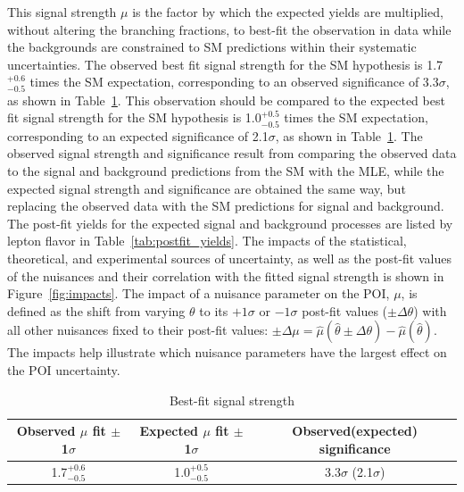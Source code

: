 This signal strength $\mu$ is the factor by which the expected \tth yields are multiplied, without altering the branching fractions, to best-fit the observation in data
while the backgrounds are constrained to SM predictions within their systematic uncertainties.
The observed  best fit signal strength for the SM \tth hypothesis is 1.7$^{+0.6}_{-0.5}$ times the SM expectation,
corresponding to an observed significance of 3.3$\sigma$, as shown in Table~\ref{tab:mu}.
This observation should be compared to the expected best fit signal strength for the SM \tth hypothesis is 1.0$^{+0.5}_{-0.5}$ times the SM expectation,
corresponding to an expected significance of 2.1$\sigma$, as shown in Table~\ref{tab:mu}.
The observed signal strength and significance result from comparing the observed data to the signal and background predictions from the SM with the MLE,
while the expected signal strength and significance are obtained the same way, but replacing the observed data with the SM predictions for signal and background.
The post-fit yields for the expected signal and background processes are listed by lepton flavor in Table~\ref{tab:postfit_yields}.
The impacts of the statistical, theoretical, and experimental sources of uncertainty, as well as the post-fit values of the nuisances and their correlation with
the fitted signal strength is shown in Figure~\ref{fig:impacts}. The impact of a nuisance parameter on the POI, $\mu$, is defined as the shift
from varying $\theta$ to its $+1\sigma$ or $-1\sigma$ post-fit values ($\pm\Delta\theta$) with all other nuisances fixed to their post-fit values:
$\pm\Delta\mu = \hat{\mu}(\hat{\theta}\pm\Delta\theta) -\hat{\mu}(\hat{\theta})$. The impacts help illustrate which nuisance parameters have the largest effect on
the POI uncertainty. 


\begin{table}[htbp]
\begin{center}
  \caption[TABLE OF BEST-FIT SIGNAL STRENGTH]{Best-fit signal strength}
    \begin{tabular}{c c c} \hline
      Observed $\mu$ fit $\pm$1$\sigma$ & Expected $\mu$ fit $\pm$1$\sigma$ & Observed(expected) significance \\ \hline 
      1.7$^{+0.6}_{-0.5}$ & 1.0$^{+0.5}_{-0.5}$ & 3.3$\sigma$ (2.1$\sigma$)  \\
      \hline
    \end{tabular}
    \label{tab:mu}
\end{center}
\end{table}


